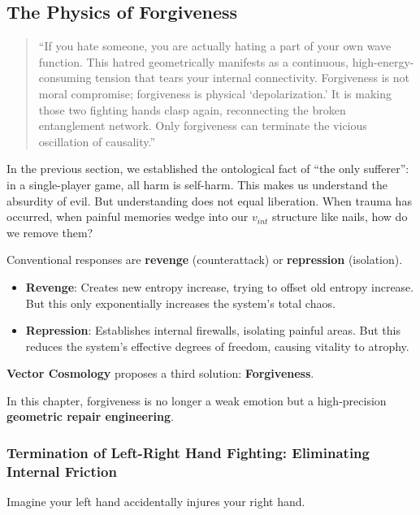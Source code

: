 \subsection{The Physics of Forgiveness}

\begin{quote}
``If you hate someone, you are actually hating a part of your own wave function. This hatred geometrically manifests as a continuous, high-energy-consuming tension that tears your internal connectivity. Forgiveness is not moral compromise; forgiveness is physical `depolarization.' It is making those two fighting hands clasp again, reconnecting the broken entanglement network. Only forgiveness can terminate the vicious oscillation of causality.''
\end{quote}

In the previous section, we established the ontological fact of ``the only sufferer'': in a single-player game, all harm is self-harm. This makes us understand the absurdity of evil. But understanding does not equal liberation. When trauma has occurred, when painful memories wedge into our $v_{int}$ structure like nails, how do we remove them?

Conventional responses are \textbf{revenge} (counterattack) or \textbf{repression} (isolation).

\begin{itemize}
\item \textbf{Revenge}: Creates new entropy increase, trying to offset old entropy increase. But this only exponentially increases the system's total chaos.

\item \textbf{Repression}: Establishes internal firewalls, isolating painful areas. But this reduces the system's effective degrees of freedom, causing vitality to atrophy.
\end{itemize}

\textbf{Vector Cosmology} proposes a third solution: \textbf{Forgiveness}.

In this chapter, forgiveness is no longer a weak emotion but a high-precision \textbf{geometric repair engineering}.

\subsubsection{Termination of Left-Right Hand Fighting: Eliminating Internal Friction}

Imagine your left hand accidentally injures your right hand.


